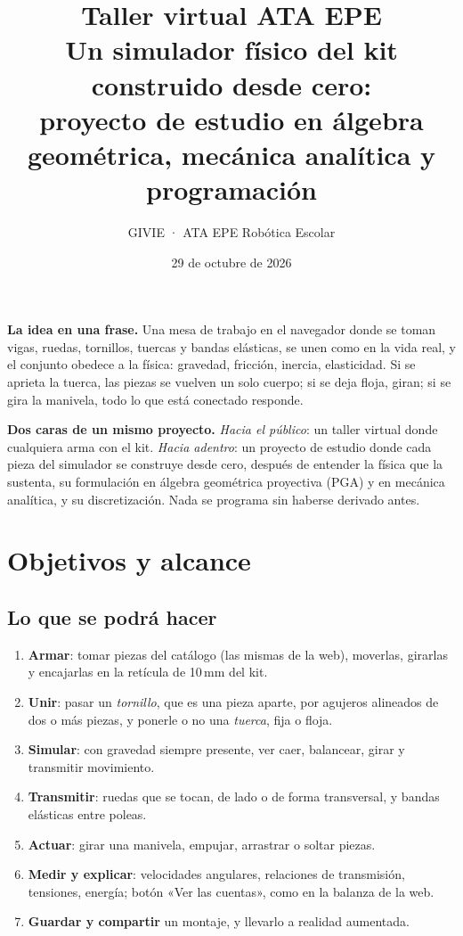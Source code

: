 \documentclass[11pt,a4paper]{article}
\title{\textcolor{morado}{\textbf{Taller virtual ATA EPE}}\\[4pt]
  \large Un simulador físico del kit construido desde cero:\\ proyecto de estudio en álgebra geométrica,
  mecánica analítica y programación}
\author{GIVIE · ATA EPE Robótica Escolar}
\date{29 de octubre de 2026}
\numberwithin{equation}{section}
\begin{document}
\maketitle

\begin{tcolorbox}[colback=morado,colframe=morado,coltext=white,arc=3mm]
\textbf{\textcolor{amarillo}{La idea en una frase.}} Una mesa de trabajo en el navegador donde se toman vigas,
ruedas, tornillos, tuercas y bandas elásticas, se unen como en la vida real, y el conjunto obedece a la física:
gravedad, fricción, inercia, elasticidad. Si se aprieta la tuerca, las piezas se vuelven un solo cuerpo; si se deja
floja, giran; si se gira la manivela, todo lo que está conectado responde.
\end{tcolorbox}

\begin{tcolorbox}[colback=amarillo!15,colframe=amarillo!80!black,arc=3mm]
\textbf{Dos caras de un mismo proyecto.} \emph{Hacia el público}: un taller virtual donde cualquiera arma con el kit.
\emph{Hacia adentro}: un proyecto de estudio donde cada pieza del simulador se construye desde cero, después de
entender la física que la sustenta, su formulación en álgebra geométrica proyectiva (PGA) y en mecánica analítica, y
su discretización. Nada se programa sin haberse derivado antes.
\end{tcolorbox}

\tableofcontents
\newpage

\section{Objetivos y alcance}

\subsection{Lo que se podrá hacer}
\begin{enumerate}[leftmargin=*]
  \item \textbf{Armar}: tomar piezas del catálogo (las mismas de la web), moverlas, girarlas y encajarlas en la
        retícula de 10\,mm del kit.
  \item \textbf{Unir}: pasar un \emph{tornillo}, que es una pieza aparte, por agujeros alineados de dos o más piezas,
        y ponerle o no una \emph{tuerca}, fija o floja.
  \item \textbf{Simular}: con gravedad siempre presente, ver caer, balancear, girar y transmitir movimiento.
  \item \textbf{Transmitir}: ruedas que se tocan, de lado o de forma transversal, y bandas elásticas entre poleas.
  \item \textbf{Actuar}: girar una manivela, empujar, arrastrar o soltar piezas.
  \item \textbf{Medir y explicar}: velocidades angulares, relaciones de transmisión, tensiones, energía; botón
        «Ver las cuentas», como en la balanza de la web.
  \item \textbf{Guardar y compartir} un montaje, y llevarlo a realidad aumentada.
\end{enumerate}
\end{document}
